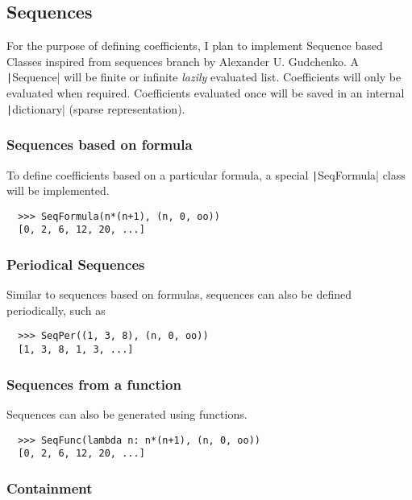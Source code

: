 \documentclass[a4paper,12pt]{article}
\newcommand{\pyline}[1]{\texttt|#1|}
\begin{document}
\subsection{Sequences}

For the purpose of defining coefficients, I plan to implement Sequence
based Classes inspired from sequences \cite{sequences} branch by
Alexander U. Gudchenko. A \pyline{Sequence} will be finite or infinite
\textit{lazily} evaluated list. Coefficients will only be evaluated
when required. Coefficients evaluated once will be saved in an
internal \pyline{dictionary} (sparse representation).

\subsubsection{Sequences based on formula}

To define coefficients based on a particular formula, a special
\pyline{SeqFormula} class will be implemented.

\begin{verbatim}
  >>> SeqFormula(n*(n+1), (n, 0, oo))
  [0, 2, 6, 12, 20, ...]
\end{verbatim}

\subsubsection{Periodical Sequences}

Similar to sequences based on formulas, sequences can also be defined
periodically, such as

\begin{verbatim}
  >>> SeqPer((1, 3, 8), (n, 0, oo))
  [1, 3, 8, 1, 3, ...]
\end{verbatim}

\subsubsection{Sequences from a function}

Sequences can also be generated using functions.

\begin{verbatim}
  >>> SeqFunc(lambda n: n*(n+1), (n, 0, oo))
  [0, 2, 6, 12, 20, ...]
\end{verbatim}

\subsubsection{Containment}
\end{document}
